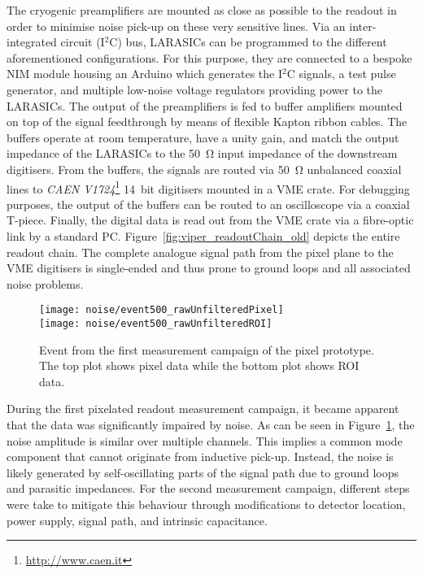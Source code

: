 The cryogenic preamplifiers are mounted as close as possible to the readout in order to minimise noise pick-up on these very sensitive lines.
Via an inter-integrated circuit (I$^2$C) bus, LARASICs can be programmed to the different aforementioned configurations.
For this purpose, they are connected to a bespoke NIM module housing an Arduino which generates the I$^2$C signals, a test pulse generator, and multiple low-noise voltage regulators providing power to the LARASICs.
The output of the preamplifiers is fed to buffer amplifiers mounted on top of the signal feedthrough by means of flexible Kapton ribbon cables.
The buffers operate at room temperature, have a unity gain, and match the output impedance of the LARASICs to the \SI{50}{\ohm} input impedance of the downstream digitisers.
From the buffers, the signals are routed via \SI{50}{\ohm} unbalanced coaxial lines to \emph{CAEN V1724}\footnote{\url{http://www.caen.it}} \SI{14}{bit} digitisers mounted in a VME crate.
For debugging purposes, the output of the buffers can be routed to an oscilloscope via a coaxial T-piece.
Finally, the digital data is read out from the VME crate via a fibre-optic link by a standard PC.
Figure~\ref{fig:viper_readoutChain_old} depicts the entire readout chain.
The complete analogue signal path from the pixel plane to the VME digitisers is single-ended and thus prone to ground loops and all associated noise problems.

\begin{figure}[htb]
	\centering
	\texttt{[image: noise/event500\_rawUnfilteredPixel]}\\
	\texttt{[image: noise/event500\_rawUnfilteredROI]}
	\caption{Event from the first measurement campaign of the pixel prototype.
	The top plot shows pixel data while the bottom plot shows ROI data.}
	\label{fig:electronics_event-run1}
\end{figure}

During the first pixelated readout measurement campaign, it became apparent that the data was significantly impaired by noise.
As can be seen in Figure~\ref{fig:electronics_event-run1}, the noise amplitude is similar over multiple channels.
This implies a common mode component that cannot originate from inductive pick-up.
Instead, the noise is likely generated by self-oscillating parts of the signal path due to ground loops and parasitic impedances.
For the second measurement campaign, different steps were take to mitigate this behaviour through modifications to detector location, power supply, signal path, and intrinsic capacitance.

